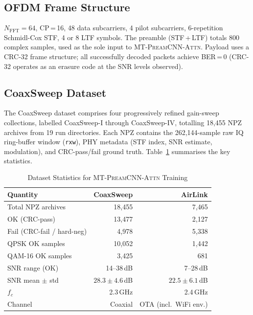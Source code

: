 \documentclass[conference]{IEEEtran}
\newcommand{\mtcnnattn}{\textsc{MT-PreamCNN-Attn}}
\begin{document}
\subsection{OFDM Frame Structure}
\label{sec:phy}

$N_\text{FFT} = 64$, CP\,=\,16, 48 data subcarriers, 4 pilot
subcarriers, 6-repetition Schmidl-Cox STF, 4 or 8 LTF symbols.
The preamble (STF\,+\,LTF) totals 800 complex samples, used as the
sole input to \mtcnnattn{}.
Payload uses a CRC-32 frame structure; all successfully decoded
packets achieve BER\,=\,0 (CRC-32 operates as an erasure code at
the SNR levels observed).

\subsection{CoaxSweep Dataset}
\label{sec:coax_data}

The CoaxSweep dataset comprises four progressively refined
gain-sweep collections, labelled CoaxSweep-I through CoaxSweep-IV,
totalling 18{,}455 NPZ archives from 19 run directories.
Each NPZ contains the 262{,}144-sample raw IQ ring-buffer window
(\texttt{rxw}), PHY metadata (STF index, SNR estimate, modulation),
and CRC-pass/fail ground truth.
Table~\ref{tab:dataset} summarises the key statistics.

\begin{table}[t]
  \centering
  \caption{Dataset Statistics for \mtcnnattn{} Training}
  \label{tab:dataset}
  \renewcommand{\arraystretch}{1.15}
  \begin{tabular}{lrr}
    \toprule
    Quantity & CoaxSweep & AirLink \\
    \midrule
    Total NPZ archives    & 18{,}455 & 7{,}465 \\
    OK (CRC-pass)         & 13{,}477 & 2{,}127 \\
    Fail (CRC-fail / hard-neg) & 4{,}978 & 5{,}338 \\
    QPSK OK samples       & 10{,}052 & 1{,}442 \\
    QAM-16 OK samples     & 3{,}425  & 681 \\
    SNR range (OK)        & 14–38\,dB & 7–28\,dB \\
    SNR mean $\pm$ std    & $28.3\pm4.6$\,dB & $22.5\pm6.1$\,dB \\
    $f_c$                 & 2.3\,GHz & 2.4\,GHz \\
    Channel               & Coaxial  & OTA (incl.\ WiFi env.) \\
    \bottomrule
  \end{tabular}
\end{table}
\end{document}
